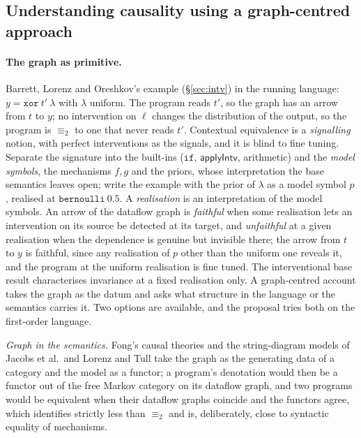 \subsection{Understanding causality using a graph-centred approach}\label{sec:prop-graph}

\paragraph{The graph as primitive.} Barrett, Lorenz and Oreshkov's example (\S\ref{sec:intv}) in the running language: $y = \mathtt{xor}\ t'\ \lambda$ with $\lambda$ uniform. The program reads $t'$, so the graph has an arrow from $t$ to $y$; no intervention on $\ell$ changes the distribution of the output, so the program is $\equiv_2$ to one that never reads $t'$. Contextual equivalence is a \emph{signalling} notion, with perfect interventions as the signals, and it is blind to fine tuning. Separate the signature into the built-ins ($\mathtt{if}$, $\mathsf{applyIntv}$, arithmetic) and the \emph{model symbols}, the mechanisms $f, g$ and the priors, whose interpretation the base semantics leaves open; write the example with the prior of $\lambda$ as a model symbol $p$, realised at $\mathtt{bernoulli}\ 0.5$. A \emph{realisation} is an interpretation of the model symbols. An arrow of the dataflow graph is \emph{faithful} when some realisation lets an intervention on its source be detected at its target, and \emph{unfaithful} at a given realisation when the dependence is genuine but invisible there; the arrow from $t$ to $y$ is faithful, since any realisation of $p$ other than the uniform one reveals it, and the program at the uniform realisation is fine tuned. The interventional base result characterises invariance at a fixed realisation only. A graph-centred account takes the graph as the datum and asks what structure in the language or the semantics carries it. Two options are available, and the proposal tries both on the first-order language.

\emph{Graph in the semantics.} Fong's causal theories and the string-diagram models of Jacobs et al.\ and Lorenz and Tull take the graph as the generating data of a category and the model as a functor; a program's denotation would then be a functor out of the free Markov category on its dataflow graph, and two programs would be equivalent when their dataflow graphs coincide and the functors agree, which identifies strictly less than $\equiv_2$ and is, deliberately, close to syntactic equality of mechanisms.

